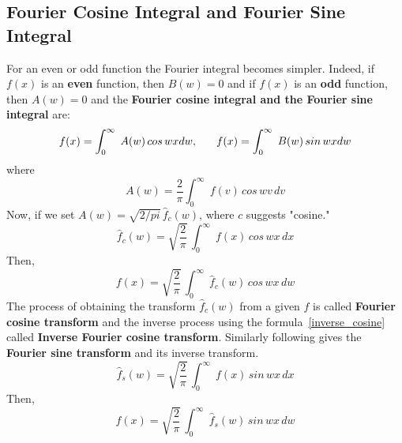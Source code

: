 \message{ !name(ch3_aima331.tex)}\documentclass[aima331_lecturenotes_ku.tex]{subfiles}
\begin{document}
\subsection{Fourier Cosine Integral and Fourier Sine Integral}
For an even or odd function the Fourier integral becomes simpler. Indeed, if $f(x)$ is an \textbf{even} function, then $B(w)=0$ and if $f(x)$ is an \textbf{odd} function, then $A(w)=0$  and the \textbf{Fourier cosine integral and the Fourier sine integral} are:
\begin{equation}
  \label{fourier_cosine}
f(x) = \int_0^{\infty} \; A(w)\, cos\,wx dw, \hspace{6mm} f(x) = \int_0^{\infty} \; B(w)\, sin\,wx dw
\end{equation}
where
\begin{equation*}
    A(w) = \frac{2}{\pi} \int_0^{\infty} \; f(v)\,cos\,wv\,dv
  \end{equation*}
  Now, if we set $A(w) = \sqrt{2/pi}\, \hat{f}_c(w)$, where $c$ suggests "cosine."
  \begin{equation}
    \label{cosine}
    \hat{f}_c(w) = \sqrt{\frac{2}{\pi}} \, \int_0^{\infty} \; f(x)\,cos\,wx\,dx
  \end{equation}
  Then,
  \begin{equation}
    \label{inverse_cosine}
    f(x)=\sqrt{\frac{2}{\pi}} \, \int_0^{\infty} \; \hat{f}_c(w) \,cos\,wx\,dw
  \end{equation}
  The process of obtaining the transform $\hat{f}_c(w)$ from a given $f$ is called \textbf{Fourier cosine transform} and the inverse process using the formula~\ref{inverse_cosine} called \textbf{Inverse Fourier cosine transform}. Similarly following gives the \textbf{Fourier sine transform} and its inverse transform.
    \begin{equation}
    \label{sine}
    \hat{f}_s(w) = \sqrt{\frac{2}{\pi}} \, \int_0^{\infty} \; f(x)\,sin\,wx\,dx
  \end{equation}
  Then,
  \begin{equation}
    \label{inverse_sine}
    f(x)=\sqrt{\frac{2}{\pi}} \, \int_0^{\infty} \; \hat{f}_s(w) \,sin\,wx\,dw
  \end{equation}
\end{document}
